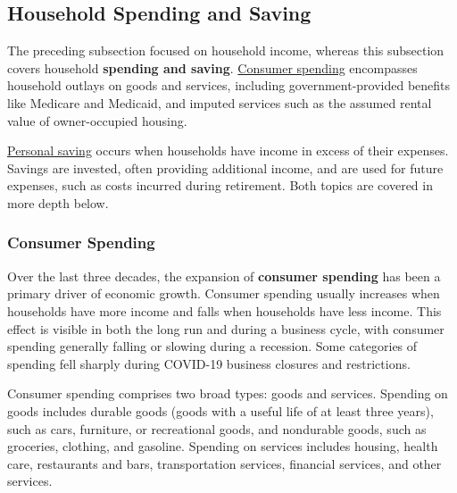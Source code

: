 \vspace{-3mm}

\hspace{-5mm} 
\vspace{-6mm}

\begin{minipage}{0.76\textwidth} 
\end{minipage}
\newpage 
\subsection*{Household Spending and Saving}
\begin{minipage}{0.76\textwidth}    
\hypertarget{hhss}{\label{hhss}} 
\small The preceding subsection focused on household income, whereas this subsection covers household \textbf{spending and saving}. \href{https://www.bea.gov/data/consumer-spending/main}{Consumer spending} encompasses household outlays on goods and services, including government-provided benefits like Medicare and Medicaid, and imputed services such as the assumed rental value of owner-occupied housing.

\href{https://www.bea.gov/data/income-saving/personal-saving-rate}{Personal saving} occurs when households have income in excess of their expenses. Savings are invested, often providing additional income, and are used for future expenses, such as costs incurred during retirement. Both topics are covered in more depth below.
\vspace{1mm}
\end{minipage}
\subsubsection*{Consumer Spending}
\pcelevelstab
\begin{minipage}{0.76\textwidth}
\vspace{-1mm}
\small Over the last three decades, the expansion of \textbf{consumer spending} has been a primary driver of economic growth. Consumer spending usually increases when households have more income and falls when households have less income. This effect is visible in both the long run and during a business cycle, with consumer spending generally falling or slowing during a recession. Some categories of spending fell sharply during COVID-19 business closures and restrictions.

Consumer spending comprises two broad types: goods and services. Spending on goods includes durable goods (goods with a useful life of at least three years), such as cars, furniture, or recreational goods, and nondurable goods, such as groceries, clothing, and gasoline. Spending on services includes housing, health care, restaurants and bars, transportation services, financial services, and other services. 
\end{minipage}

